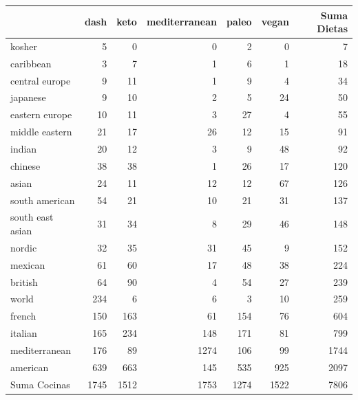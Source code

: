 \documentclass[12pt,a4paper]{article}
\begin{document}
        \begin{center}
            \begin{tabular}{l|rrrrr|r}
                \toprule
                & dash & keto & mediterranean & paleo & vegan & Suma Dietas \\
                \midrule
                kosher           & 5    & 0    & 0    & 2    & 0    & 7    \\
                caribbean        & 3    & 7    & 1    & 6    & 1    & 18   \\
                central europe   & 9    & 11   & 1    & 9    & 4    & 34   \\
                japanese         & 9    & 10   & 2    & 5    & 24   & 50   \\
                eastern europe   & 10   & 11   & 3    & 27   & 4    & 55   \\
                middle eastern   & 21   & 17   & 26   & 12   & 15   & 91   \\
                indian           & 20   & 12   & 3    & 9    & 48   & 92   \\
                chinese          & 38   & 38   & 1    & 26   & 17   & 120  \\
                asian            & 24   & 11   & 12   & 12   & 67   & 126  \\
                south american   & 54   & 21   & 10   & 21   & 31   & 137  \\
                south east asian & 31   & 34   & 8    & 29   & 46   & 148  \\
                nordic           & 32   & 35   & 31   & 45   & 9    & 152  \\
                mexican          & 61   & 60   & 17   & 48   & 38   & 224  \\
                british          & 64   & 90   & 4    & 54   & 27   & 239  \\
                world            & 234  & 6    & 6    & 3    & 10   & 259  \\
                french           & 150  & 163  & 61   & 154  & 76   & 604  \\
                italian          & 165  & 234  & 148  & 171  & 81   & 799  \\
                mediterranean    & 176  & 89   & 1274 & 106  & 99   & 1744 \\
                american         & 639  & 663  & 145  & 535  & 925  & 2097 \\
                \midrule
                Suma Cocinas     & 1745 & 1512 & 1753 & 1274 & 1522 & 7806 \\
                \bottomrule
            \end{tabular}
        \end{center}
\end{document}
